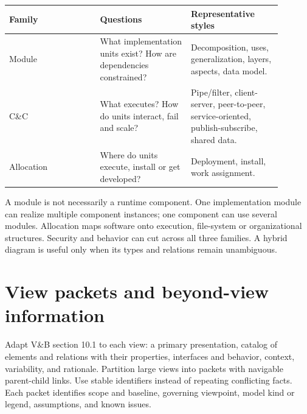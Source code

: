 \documentclass[11pt,letterpaper]{article}
\newcommand{\docsection}[1]{\Needspace{5\baselineskip}\section{#1}}
\begin{document}
\begin{longtable}{@{}>{\RaggedRight\arraybackslash}p{0.297\linewidth}>{\RaggedRight\arraybackslash}p{0.297\linewidth}>{\RaggedRight\arraybackslash}p{0.297\linewidth}@{}}
\toprule
\textbf{Family} & \textbf{Questions} & \textbf{Representative styles}\\\midrule
\endhead
Module & What implementation units exist? How are dependencies constrained? & Decomposition, uses, generalization, layers, aspects, data model.\\
C\&C & What executes? How do units interact, fail and scale? & Pipe/filter, client-server, peer-to-peer, service-oriented, publish-subscribe, shared data.\\
Allocation & Where do units execute, install or get developed? & Deployment, install, work assignment.\\
\bottomrule
\end{longtable}
A module is not necessarily a runtime component. One implementation module can realize multiple component instances; one component can use several modules. Allocation maps software onto execution, file-system or organizational structures. Security and behavior can cut across all three families. A hybrid diagram is useful only when its types and relations remain unambiguous.

\docsection{View packets and beyond-view information}
Adapt V\&B section 10.1 to each view: a primary presentation, catalog of elements and relations with their properties, interfaces and behavior, context, variability, and rationale. Partition large views into packets with navigable parent-child links. Use stable identifiers instead of repeating conflicting facts. Each packet identifies scope and baseline, governing viewpoint, model kind or legend, assumptions, and known issues.
\end{document}
